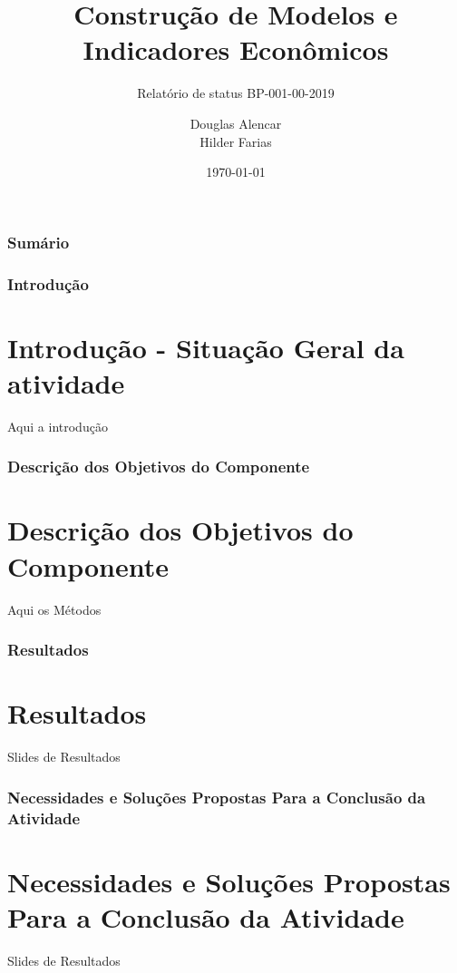 \documentclass[11pt]{beamer}
\author{Douglas Alencar\\
		Hilder Farias}
\title{Construção de Modelos e Indicadores Econômicos}
\subtitle{Relatório de status BP-001-00-2019}
\institute{PPGE-FACECON-ICSA}
\date{\today}
\begin{document}
\begin{frame}
\titlepage
\end{frame}


\begin{frame}
\frametitle{Sumário}
\begin{multicols}{2}
		\tableofcontents
\end{multicols}
\end{frame}





\begin{frame}
\frametitle{Introdução}
\section{Introdução - Situação Geral da atividade}
Aqui a introdução

\cite{Coutinho2016,DeLima2018,Vogt2016}
\end{frame}



\begin{frame}
\frametitle{Descrição dos Objetivos do Componente}
\section{Descrição dos Objetivos do Componente}

Aqui os Métodos 
\cite{Almeida2017,Almeida2009a}

\end{frame}


\begin{frame}
\frametitle{Resultados}
\section{Resultados}

Slides de Resultados


\end{frame}

\begin{frame}
\frametitle{Necessidades e Soluções Propostas Para a Conclusão da Atividade}
\section{Necessidades e Soluções Propostas Para a Conclusão da Atividade}

Slides de Resultados


\end{frame}
\end{document}
